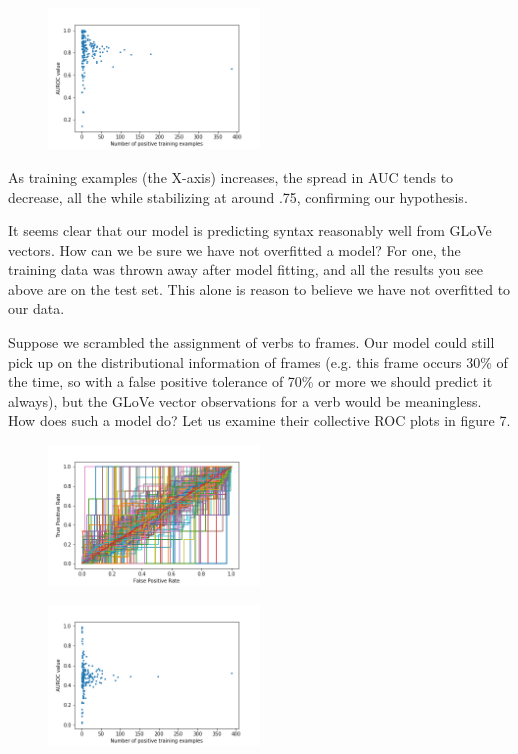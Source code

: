 \documentclass[11pt,a4paper]{article}
\begin{document}
\begin{figure}
	\centering
	\includegraphics[width=0.5\textwidth]{auc_scatter5.png}
	\caption{\label{fig:frog} }
\end{figure}

As training examples (the X-axis) increases, the spread in AUC tends to decrease, all the while stabilizing at around .75, confirming our hypothesis.

It seems clear that our model is predicting syntax reasonably well from GLoVe vectors. How can we be sure we have not overfitted a model? For one, the training data was thrown away after model fitting, and all the results you see above are on the test set. This alone is reason to believe we have not overfitted to our data.

Suppose we scrambled the assignment of verbs to frames. Our model could still pick up on the distributional information of frames (e.g. this frame occurs 30\% of the time, so with a false positive tolerance of 70\% or more we should predict it always), but the GLoVe vector observations for a verb would be meaningless. How does such a model do? Let us examine their collective ROC plots in figure 7.

\begin{figure}
	\centering
	\includegraphics[width=0.5\textwidth]{auc_plot5rand.png}
	\caption{\label{fig:frog} }
\end{figure}

\begin{figure}
	\centering
	\includegraphics[width=0.5\textwidth]{auc_scatter5rand.png}
	\caption{\label{fig:frog} }
\end{figure}
\end{document}
